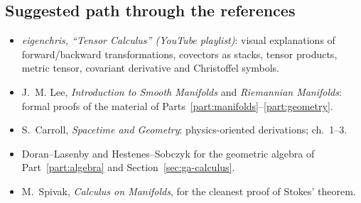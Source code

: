 \subsection{Suggested path through the references}
\begin{itemize}
\item \emph{eigenchris, ``Tensor Calculus'' (YouTube playlist)}: visual explanations of forward/backward transformations, covectors as stacks, tensor products, metric tensor, covariant derivative and Christoffel symbols.
\item J.~M. Lee, \emph{Introduction to Smooth Manifolds} and \emph{Riemannian Manifolds}: formal proofs of the material of Parts~\ref{part:manifolds}--\ref{part:geometry}.
\item S.~Carroll, \emph{Spacetime and Geometry}: physics-oriented derivations; ch.~1--3.
\item Doran--Lasenby and Hestenes--Sobczyk for the geometric algebra of Part~\ref{part:algebra} and Section~\ref{sec:ga-calculus}.
\item M.~Spivak, \emph{Calculus on Manifolds}, for the cleanest proof of Stokes' theorem.
\end{itemize}

